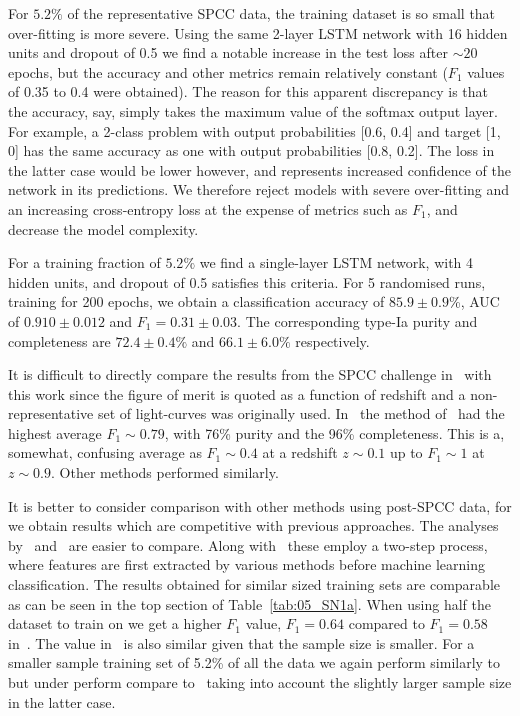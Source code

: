 \documentclass[twocolumn]{aastex61}
\begin{document}
For $5.2\%$ of the representative SPCC data, the training dataset is so small that over-fitting is more severe. Using the same 2-layer LSTM network with 16 hidden units and dropout of 0.5 we find a notable increase in the test loss after $\sim 20$ epochs, but the accuracy and other metrics remain relatively constant ($F_1$ values of 0.35 to 0.4 were obtained). The reason for this apparent discrepancy is that the accuracy, say, simply takes the maximum value of the softmax output layer. For example, a 2-class problem with output probabilities [0.6, 0.4] and target [1, 0] has the same accuracy as one with output probabilities [0.8, 0.2]. The loss in the latter case would be lower however, and represents increased confidence of the network in its predictions. We therefore reject models with severe over-fitting and an increasing cross-entropy loss at the expense of metrics such as $F_1$, and decrease the model complexity. 

For a training fraction of  $5.2\%$ we find a single-layer LSTM network, with 4 hidden units, and dropout of 0.5 satisfies this criteria. For 5 randomised runs, training for 200 epochs, we obtain a classification accuracy of $85.9 \pm 0.9$\%, AUC of $0.910 \pm 0.012$ and $F_1 = 0.31 \pm 0.03$. The corresponding type-Ia purity and completeness are $72.4\pm0.4\%$ and $66.1\pm6.0\%$ respectively.

It is difficult to directly compare the results from the SPCC challenge in~\cite{Kessler:2010qj} with this work since the figure of merit is quoted as a function of redshift and a non-representative set of light-curves was originally used. In~\cite{Kessler:2010qj} the method of~\cite{2008AJ....135..348S} had the highest average $F_1\sim0.79$, with 76\% purity and the 96\% completeness. This is a, somewhat, confusing average as $F_1\sim 0.4$ at a redshift $z\sim0.1$ up to $F_1\sim1$ at $z\sim0.9$. Other methods performed similarly. 

It is better to consider comparison with other methods using post-SPCC data, for we obtain results which are competitive with previous approaches. The analyses by~\cite{Karpenka:2012pm} and~\cite{Newling:2010bp} are easier to compare. Along with~\cite{Lochner:2016hbn} these employ a two-step process, where features are first extracted by various methods before machine learning classification. The results obtained for similar sized training sets are comparable as can be seen in the top section of Table~\ref{tab:05_SN1a}. When using half the dataset to train on we get a higher $F_1$ value, $F_1=0.64$ compared to $F_1=0.58$ in~\cite{Karpenka:2012pm}. The value in~\cite{Newling:2010bp} is also similar given that the sample size is smaller. For a smaller sample training set of 5.2\% of all the data we again perform similarly to~\cite{Karpenka:2012pm} but under perform compare to~\cite{Newling:2010bp} taking into account the slightly larger sample size in the latter case.
\end{document}
